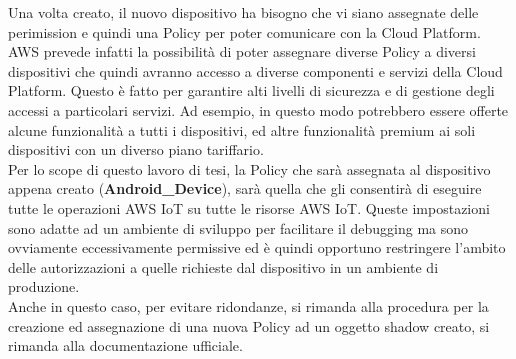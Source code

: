 Una volta creato, il nuovo dispositivo ha bisogno che vi siano assegnate delle perimission e quindi una Policy per poter comunicare con la Cloud Platform. AWS prevede infatti la possibilità di poter assegnare diverse Policy a diversi dispositivi che quindi avranno accesso a diverse componenti e servizi della Cloud Platform. Questo è fatto per garantire alti livelli di sicurezza e di gestione degli accessi a particolari servizi. Ad esempio, in questo modo potrebbero essere offerte alcune funzionalità a tutti i dispositivi, ed altre funzionalità premium ai soli dispositivi con un diverso piano tariffario.\\
Per lo scope di questo lavoro di tesi, la Policy che sarà assegnata al dispositivo appena creato (\textbf{Android\_Device}), sarà quella che gli consentirà di eseguire tutte le operazioni AWS IoT su tutte le risorse
AWS IoT. Queste impostazioni sono adatte ad un ambiente di sviluppo per facilitare il debugging ma sono ovviamente eccessivamente permissive ed è quindi opportuno restringere l'ambito delle autorizzazioni a quelle richieste dal dispositivo in un ambiente di produzione.\\
Anche in questo caso, per evitare ridondanze, si rimanda alla procedura per la creazione ed assegnazione di una nuova Policy ad un oggetto shadow creato, si rimanda alla documentazione ufficiale.

